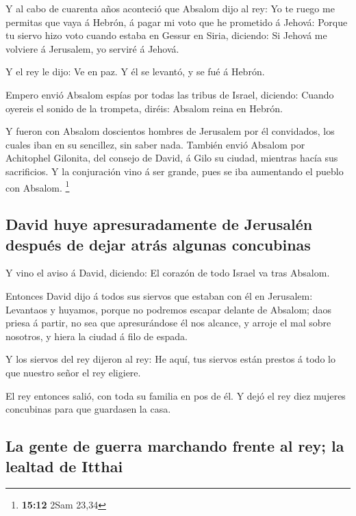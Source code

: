  Y al cabo de cuarenta años aconteció que Absalom dijo al
rey: Yo te ruego me permitas que vaya á Hebrón, á pagar mi voto que he
prometido á Jehová:  Porque tu siervo hizo voto cuando
estaba en Gessur en Siria, diciendo: Si Jehová me volviere á Jerusalem,
yo serviré á Jehová.

 Y el rey le dijo: Ve en paz. Y él se levantó, y se fué á
Hebrón.

 Empero envió Absalom espías por todas las tribus de
Israel, diciendo: Cuando oyereis el sonido de la trompeta, diréis:
Absalom reina en Hebrón.

 Y fueron con Absalom doscientos hombres de Jerusalem por
él convidados, los cuales iban en su sencillez, sin saber nada.
 También envió Absalom por Achitophel Gilonita, del consejo
de David, á Gilo su ciudad, mientras hacía sus sacrificios. Y la
conjuración vino á ser grande, pues se iba aumentando el pueblo con
Absalom. \footnote{\textbf{15:12} 2Sam 23,34}

\hypertarget{david-huye-apresuradamente-de-jerusaluxe9n-despuuxe9s-de-dejar-atruxe1s-algunas-concubinas}{%
\subsection{David huye apresuradamente de Jerusalén después de dejar
atrás algunas
concubinas}\label{david-huye-apresuradamente-de-jerusaluxe9n-despuuxe9s-de-dejar-atruxe1s-algunas-concubinas}}

 Y vino el aviso á David, diciendo: El corazón de todo
Israel va tras Absalom.

 Entonces David dijo á todos sus siervos que estaban con él
en Jerusalem: Levantaos y huyamos, porque no podremos escapar delante de
Absalom; daos priesa á partir, no sea que apresurándose él nos alcance,
y arroje el mal sobre nosotros, y hiera la ciudad á filo de espada.

 Y los siervos del rey dijeron al rey: He aquí, tus siervos
están prestos á todo lo que nuestro señor el rey eligiere.

 El rey entonces salió, con toda su familia en pos de él. Y
dejó el rey diez mujeres concubinas para que guardasen la casa.

\hypertarget{la-gente-de-guerra-marchando-frente-al-rey-la-lealtad-de-itthai}{%
\subsection{La gente de guerra marchando frente al rey; la lealtad de
Itthai}\label{la-gente-de-guerra-marchando-frente-al-rey-la-lealtad-de-itthai}}

